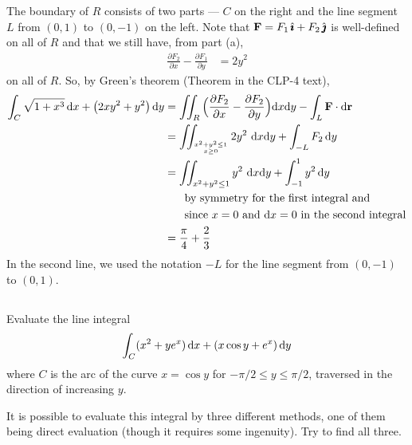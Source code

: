 \begin{solution}
The boundary of $R$ consists of two parts --- $C$ on the right
and the line segment $L$ from $(0,1)$ to $(0,-1)$ on the left.
Note that $\mathbf{F}=F_1\,\hat{\pmb{\imath}} +F_2\,\hat{\pmb{\jmath}}$ is well-defined on all of $R$ 
and that we still have, from part (a),
\begin{align*}
\frac{\partial F_2}{\partial x}  - 
\frac{\partial F_1}{\partial y} 
&=2y^2
\end{align*}
on all of $R$. So, by Green's theorem (Theorem  in the CLP-4 text), 
\begin{align*}
\int_C \sqrt{1+x^3}\,\dee{x} +\big(2xy^2 + y^2\big)\,\dee{y}
&=\dblInt_R \Big(\frac{\partial F_2}{\partial x} - 
          \frac{\partial F_2}{\partial y} \Big)\dee{x}\dee{y}
 - \int_L\vF\cdot\dee{\vr} \\
&=\dblInt_{\Atop{x^2+y^2\le 1}{x\ge 0}} 2y^2\  \dee{x}\dee{y}
  + \int_{-L} F_2\,\dee{y} \\
&=\dblInt_{x^2+y^2\le 1} y^2\  \dee{x}\dee{y}
  + \int_{-1}^1 y^2\,\dee{y} \\
&\hskip0.25in\text{by symmetry for the first integral and} \\
&\hskip0.25in\text{since $x=0$ and $\dee{x}=0$ in the second integral} \\
&=\frac{\pi}{4} + \frac{2}{3}
\end{align*}
In the second line, we used the notation $-L$ for the line segment
from $(0,-1)$ to $(0,1)$.
\end{solution}





\subsection*{\Application}


\begin{question}[M317 2007A] %
Evaluate the line integral
\begin{equation*}
\int_C (x^2 + y e^x ) \,\mathrm{d}x + (x \cos y + e^x ) \,\mathrm{d}y
\end{equation*}
where $C$ is the arc of the curve $x = \cos y$ for $-\pi/2 \le y \le \pi/2$, 
traversed in the direction of increasing $y$.
\end{question}

\begin{hint} 
It is possible to evaluate this integral by three different methods,
one of them being direct evaluation (though it requires
some ingenuity). Try to find all three.
\end{hint}

